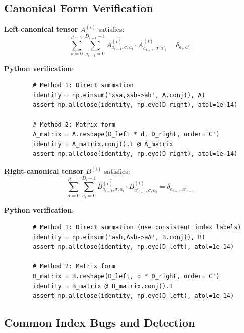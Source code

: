 \documentclass[aps,prb,onecolumn,scriptaddress]{revtex4-2}
\begin{document}
	\subsection{Canonical Form Verification}
	
	\textbf{Left-canonical tensor} $A^{(i)}$ satisfies:
	\begin{equation}
		\sum_{\sigma=0}^{d-1} \sum_{a_{i-1}=0}^{D_{i-1}-1} \overline{A^{(i)}_{a_{i-1},\sigma,a_i}} \cdot A^{(i)}_{a_{i-1},\sigma,a'_i} = \delta_{a_i, a'_i}
	\end{equation}
	
	\textbf{Python verification}:
	\begin{verbatim}
		# Method 1: Direct summation
		identity = np.einsum('xsa,xsb->ab', A.conj(), A)
		assert np.allclose(identity, np.eye(D_right), atol=1e-14)
		
		# Method 2: Matrix form
		A_matrix = A.reshape(D_left * d, D_right, order='C')
		identity = A_matrix.conj().T @ A_matrix
		assert np.allclose(identity, np.eye(D_right), atol=1e-14)
	\end{verbatim}
	
	\textbf{Right-canonical tensor} $B^{(i)}$ satisfies:
	\begin{equation}
		\sum_{\sigma=0}^{d-1} \sum_{a_i=0}^{D_i-1} \overline{B^{(i)}_{a_{i-1},\sigma,a_i}} \cdot B^{(i)}_{a'_{i-1},\sigma,a_i} = \delta_{a_{i-1}, a'_{i-1}}
	\end{equation}
	
	\textbf{Python verification}:
	\begin{verbatim}
		# Method 1: Direct summation (use consistent index labels)
		identity = np.einsum('asb,Asb->aA', B.conj(), B)
		assert np.allclose(identity, np.eye(D_left), atol=1e-14)
		
		# Method 2: Matrix form
		B_matrix = B.reshape(D_left, d * D_right, order='C')
		identity = B_matrix @ B_matrix.conj().T
		assert np.allclose(identity, np.eye(D_left), atol=1e-14)
	\end{verbatim}
	
	\subsection{Common Index Bugs and Detection}
	
\end{document}
